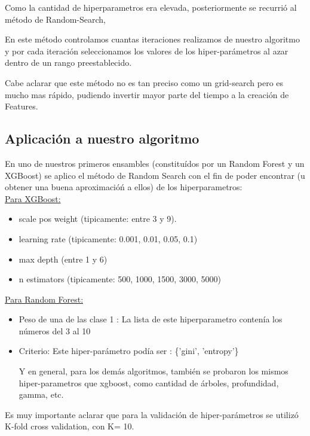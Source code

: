 \documentclass[a4paper ,12pt]{article}
\begin{document}
Como la cantidad de hiperparametros era elevada, posteriormente se recurrió al método de Random-Search,

En este método controlamos cuantas iteraciones realizamos de nuestro algoritmo y por cada iteración seleccionamos los valores de los
hiper-parámetros al azar dentro de un rango preestablecido. 

Cabe aclarar que este método no es tan preciso como un grid-search pero es mucho mas rápido, pudiendo invertir mayor parte del tiempo a la creación de Features.

\subsection{Aplicación a nuestro algoritmo}

En uno de nuestros primeros ensambles (constituídos por un Random Forest y un XGBoost) se aplico el método de Random Search con el fin de poder encontrar (u obtener una buena aproximacióń a ellos) de los hiperparametros:\\

\underline{Para XGBoost: }

\begin{itemize}
	\item scale pos weight (tipicamente: entre 3 y 9).
	\item learning rate (tipicamente: 0.001, 0.01, 0.05, 0.1)
	\item max depth (entre 1 y 6)
	\item n estimators (tipicamente: 500, 1000, 1500, 3000, 5000)
\end{itemize}



\underline{Para Random Forest:}

\begin{itemize}
	
	\item Peso de una de las clase 1 : La lista de este hiperparametro contenía los números del 3 al 10
	
	\item Criterio: Este hiper-parámetro podía ser : \{'gini', 'entropy'\}
	
	Y en general, para los demás algoritmos, también se probaron los mismos hiper-parametros que xgboost, como cantidad de árboles, profundidad, gamma, etc. 

\end{itemize}


Es muy importante aclarar que para la validación de hiper-parámetros se utilizó K-fold cross validation, con K= 10.
\end{document}

